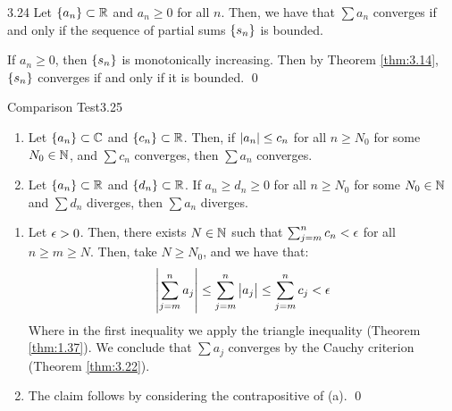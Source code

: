 \begin{theorem}{}{3.24}
    Let $\set{a_n} \subset \mathbb{R}$ and $a_n \geq 0$ for all $n$. Then, we have that $\sum a_n$ converges if and only if the sequence of partial sums $\set{s_n}$ is bounded.
\end{theorem}
\begin{nproof}
    If $a_n \geq 0$, then $\set{s_n}$ is monotonically increasing. Then by Theorem \ref{thm:3.14}, $\set{s_n}$ converges if and only if it is bounded. \qed
\end{nproof}

\begin{theorem}{Comparison Test}{3.25}
    \begin{enumerate}
        \item Let $\set{a_n} \subset \mathbb{C}$ and $\set{c_n} \subset \mathbb{R}$. Then, if $\abs{a_n} \leq c_n$ for all $n \geq N_0$ for some $N_0 \in \mathbb{N}$, and $\sum c_n$ converges, then $\sum a_n$ converges. 
        \item Let $\set{a_n} \subset \mathbb{R}$ and $\set{d_n} \subset \mathbb{R}$. If $a_n \geq d_n \geq 0$ for all $n \geq N_0$ for some $N_0 \in \mathbb{N}$ and $\sum d_n$ diverges, then $\sum a_n$ diverges.
    \end{enumerate}
\end{theorem}
\begin{nproof}
    \begin{enumerate}
        \item Let $\epsilon > 0$. Then, there exists $N \in \mathbb{N}$ such that $\sum_{j = m}^n c_n < \epsilon$ for all $n \geq m \geq N$. Then, take $N \geq N_0$, and we have that:
        \begin{align*}
            \abs{\sum_{j=m}^n a_j} \leq \sum_{j=m}^n \abs{a_j} \leq \sum_{j=m}^n c_j < \epsilon
        \end{align*}
        Where in the first inequality we apply the triangle inequality (Theorem \ref{thm:1.37}). We conclude that $\sum a_j$ converges by the Cauchy criterion (Theorem \ref{thm:3.22}).
        \item The claim follows by considering the contrapositive of (a). \qed
    \end{enumerate}
\end{nproof}

